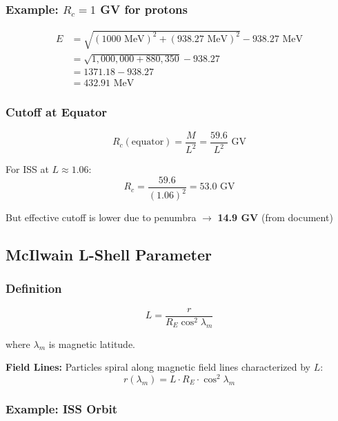 \documentclass[11pt,a4paper]{article}
\begin{document}
\subsubsection{Example: $R_c = 1$ GV for protons}

\begin{align}
E &= \sqrt{(1000 \text{ MeV})^2 + (938.27 \text{ MeV})^2} - 938.27 \text{ MeV} \\
&= \sqrt{1{,}000{,}000 + 880{,}350} - 938.27 \\
&= 1371.18 - 938.27 \\
&= 432.91 \text{ MeV}
\end{align}

\subsubsection{Cutoff at Equator}

\begin{equation}
R_c(\text{equator}) = \frac{M}{L^2} = \frac{59.6}{L^2} \text{ GV}
\end{equation}

For ISS at $L \approx 1.06$:
\begin{equation}
R_c = \frac{59.6}{(1.06)^2} = 53.0 \text{ GV}
\end{equation}

But effective cutoff is lower due to penumbra $\to$ \textbf{14.9 GV} (from document)

\subsection{McIlwain L-Shell Parameter}

\subsubsection{Definition}

\begin{equation}
L = \frac{r}{R_E \cos^2 \lambda_m}
\end{equation}

where $\lambda_m$ is magnetic latitude.

\textbf{Field Lines:} Particles spiral along magnetic field lines characterized by $L$:
\begin{equation}
r(\lambda_m) = L \cdot R_E \cdot \cos^2 \lambda_m
\end{equation}

\subsubsection{Example: ISS Orbit}
\end{document}
